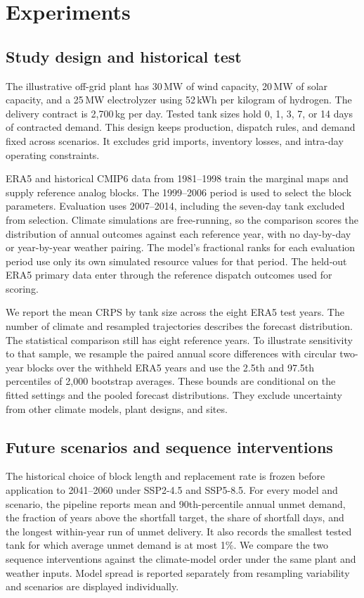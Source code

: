 \section{Experiments}
\label{sec:experiments}

\subsection{Study design and historical test}
The illustrative off-grid plant has 30\,MW of wind capacity, 20\,MW of solar capacity, and a 25\,MW electrolyzer using 52\,kWh per kilogram of hydrogen. The delivery contract is 2{,}700\,kg per day. Tested tank sizes hold 0, 1, 3, 7, or 14 days of contracted demand. This design keeps production, dispatch rules, and demand fixed across scenarios. It excludes grid imports, inventory losses, and intra-day operating constraints.

ERA5 and historical CMIP6 data from 1981--1998 train the marginal maps and supply reference analog blocks. The 1999--2006 period is used to select the block parameters. Evaluation uses 2007--2014, including the seven-day tank excluded from selection. Climate simulations are free-running, so the comparison scores the distribution of annual outcomes against each reference year, with no day-by-day or year-by-year weather pairing. The model's fractional ranks for each evaluation period use only its own simulated resource values for that period. The held-out ERA5 primary data enter through the reference dispatch outcomes used for scoring.

We report the mean CRPS by tank size across the eight ERA5 test years. The number of climate and resampled trajectories describes the forecast distribution. The statistical comparison still has eight reference years. To illustrate sensitivity to that sample, we resample the paired annual score differences with circular two-year blocks over the withheld ERA5 years and use the 2.5th and 97.5th percentiles of 2{,}000 bootstrap averages. These bounds are conditional on the fitted settings and the pooled forecast distributions. They exclude uncertainty from other climate models, plant designs, and sites.

\subsection{Future scenarios and sequence interventions}
The historical choice of block length and replacement rate is frozen before application to 2041--2060 under SSP2-4.5 and SSP5-8.5. For every model and scenario, the pipeline reports mean and 90th-percentile annual unmet demand, the fraction of years above the shortfall target, the share of shortfall days, and the longest within-year run of unmet delivery. It also records the smallest tested tank for which average unmet demand is at most 1\%. We compare the two sequence interventions against the climate-model order under the same plant and weather inputs. Model spread is reported separately from resampling variability and scenarios are displayed individually.

